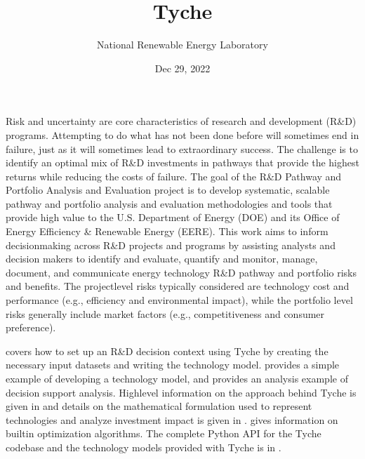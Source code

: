 \documentclass[letterpaper,10pt,english]{sphinxmanual}
\title{Tyche}
\date{Dec 29, 2022}
\author{National Renewable Energy Laboratory}
\begin{document}
\pagestyle{empty}
\sphinxmaketitle
\pagestyle{plain}
\sphinxtableofcontents
\pagestyle{normal}
\label{\detokenize{index::doc}}


\sphinxAtStartPar
Risk and uncertainty are core characteristics of research and development (R\&D) programs. Attempting to do what has not been done before will sometimes end in failure, just as it will sometimes lead to extraordinary success. The challenge is to identify an optimal mix of R\&D investments in pathways that provide the highest returns while reducing the costs of failure. The goal of the R\&D Pathway and Portfolio Analysis and Evaluation project is to develop systematic, scalable pathway and portfolio analysis and evaluation methodologies and tools that provide high value to the U.S. Department of Energy (DOE) and its Office of Energy Efficiency \& Renewable Energy (EERE). This work aims to inform decision\sphinxhyphen{}making across R\&D projects and programs by assisting analysts and decision makers to identify and evaluate, quantify and monitor, manage, document, and communicate energy technology R\&D pathway and portfolio risks and benefits. The project\sphinxhyphen{}level risks typically considered are technology cost and performance (e.g., efficiency and environmental impact), while the portfolio level risks generally include market factors (e.g., competitiveness and consumer preference).

\sphinxAtStartPar
{\hyperref[\detokenize{cheat-sheet:sec-quickstart}]{}} covers how to set up an R\&D decision context using Tyche by creating the necessary input datasets and writing the technology model. {\hyperref[\detokenize{example-technology:sec-techmodelexample}]{}} provides a simple example of developing a technology model, and {\hyperref[\detokenize{example-analysis:sec-analysisexample}]{}} provides an analysis example of decision support analysis. High\sphinxhyphen{}level information on the approach behind Tyche is given in {\hyperref[\detokenize{approach:sec-approach}]{}} and details on the mathematical formulation used to represent technologies and analyze investment impact is given in {\hyperref[\detokenize{formulation:sec-formulation}]{}}. {\hyperref[\detokenize{optimizers:sec-optimizers}]{}} gives information on built\sphinxhyphen{}in optimization algorithms. The complete Python API for the Tyche codebase and the technology models provided with Tyche is in {\hyperref[\detokenize{modules:sec-modules}]{}}.
\end{document}
